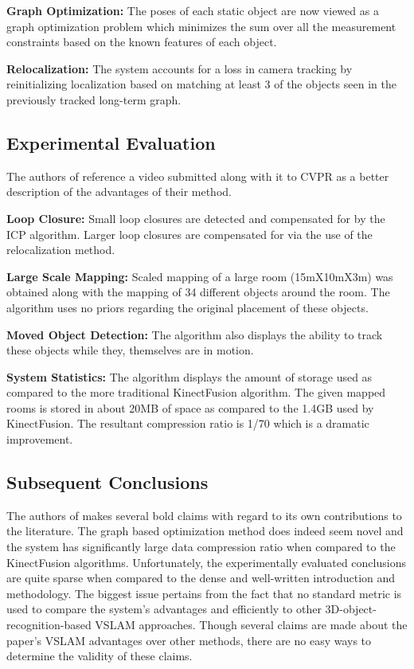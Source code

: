 \documentclass[10pt,twocolumn,letterpaper]{article}
\begin{document}
\textbf{Graph Optimization:} The poses of each static object are now viewed as a graph optimization problem which minimizes the sum over all the measurement constraints based on the known features of each object.

\textbf{Relocalization:} The system accounts for a loss in camera tracking by reinitializing localization based on matching at least 3 of the objects seen in the previously tracked long-term graph. 

\subsection{Experimental Evaluation}
The authors of \cite{Salas-Moreno_2013_CVPR} reference a video submitted along with it to CVPR as a better description of the advantages of their method. 

\textbf{Loop Closure:} Small loop closures are detected and compensated for by the ICP algorithm. Larger loop closures are compensated for via the use of the relocalization method. 

\textbf{Large Scale Mapping:} Scaled mapping of a large room (15mX10mX3m) was obtained along with the mapping of 34 different objects around the room. The algorithm uses no priors regarding the original placement of these objects.

\textbf{Moved Object Detection:} The algorithm also displays the ability to track these objects while they, themselves are in motion. 

\textbf{System Statistics:} The algorithm displays the amount of storage used as compared to the more traditional KinectFusion algorithm. The given mapped rooms is stored in about 20MB of space as compared to the 1.4GB used by KinectFusion. The resultant compression ratio is 1/70 which is a dramatic improvement. 

\subsection{Subsequent Conclusions}
The authors of \cite{Salas-Moreno_2013_CVPR} makes several bold claims with regard to its own contributions to the literature. The graph based optimization method does indeed seem novel and the system has significantly large data compression ratio when compared to the KinectFusion algorithms. Unfortunately, the experimentally evaluated conclusions are quite sparse when compared to the dense and well-written introduction and methodology. The biggest issue pertains from the fact that no standard metric is used to compare the system's advantages and efficiently to other 3D-object-recognition-based VSLAM approaches. Though several claims are made about the paper's VSLAM advantages over other methods, there are no easy ways to determine the validity of these claims.
\end{document}
